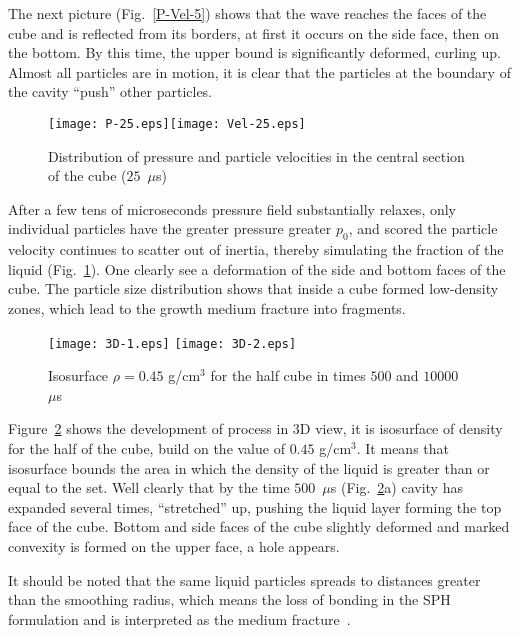 \documentclass[a4paper]{jpconf}
\begin{document}
The next picture (Fig.~\ref{P-Vel-5}) shows that the wave reaches the faces of the cube and is reflected from its borders, at first it occurs on the side face, then on the bottom. By this time, the upper bound is significantly deformed, curling up. 
Almost all particles are in motion, it is clear that the particles at the boundary of the cavity ``push'' other particles.

\begin{figure}
\begin{center}
\texttt{[image: P-25.eps]}\texttt{[image: Vel-25.eps]}
\end{center}
\caption{\label{P-Vel-25} Distribution of pressure and particle velocities in the central section of the cube ($25$~$\mu$s)}
\end{figure}


After a few tens of microseconds pressure field substantially relaxes, only individual particles have the greater pressure greater $p_0$, and scored the particle velocity continues to scatter out of inertia, thereby simulating the fraction of the liquid (Fig.~\ref{P-Vel-25}). One clearly see a deformation of the side and bottom faces of the cube. The particle size distribution shows that inside a cube formed low-density zones, which lead to the growth medium fracture into fragments.

\begin{figure}
\begin{center}
\texttt{[image: 3D-1.eps]} \hfill \texttt{[image: 3D-2.eps]}
\end{center}
\caption{\label{3D-1} Isosurface $\rho=0.45$ g/cm$^3$ for the 
half cube in times $500$ and $10000$~$\mu$s}
\end{figure}

Figure~\ref{3D-1} shows 
the development of process in 3D view, it is isosurface of density for the half of the cube, build on the value of $0.45$ g/cm$^3$. It means  that isosurface bounds the area in which the density of the liquid is greater than or equal to the set. Well clearly that by the time $500$~$\mu$s (Fig.~\ref{3D-1}a) cavity has expanded several times, ``stretched'' up, pushing the liquid layer forming the top face of the cube. Bottom and side faces of the cube slightly deformed and marked convexity is formed on the upper face, a hole appears.


It should be noted that the same liquid particles spreads to distances greater than the smoothing radius, which means the loss of bonding in the SPH formulation and is interpreted as the medium fracture~\cite{DavydovKedrinskii2013}.
\end{document}
